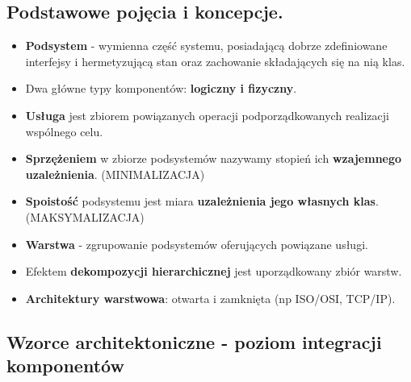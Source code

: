 \documentclass[a4paper]{article}
\begin{document}
    \subsection{Podstawowe pojęcia i koncepcje.}
    \begin{itemize}
        \item \textbf{Podsystem} - wymienna część systemu, posiadającą dobrze zdefiniowane interfejsy i
        hermetyzującą stan oraz zachowanie składających się na nią klas.
        \item Dwa główne typy komponentów: \textbf{logiczny i fizyczny}.
        \item \textbf{Usługa} jest zbiorem powiązanych operacji podporządkowanych realizacji wspólnego
        celu.
        \item \textbf{Sprzężeniem} w zbiorze podsystemów nazywamy stopień ich \textbf{wzajemnego uzależnienia}. (MINIMALIZACJA)
        \item \textbf{Spoistość} podsystemu jest miara \textbf{uzależnienia jego własnych klas}. (MAKSYMALIZACJA)
        \item \textbf{Warstwa} - zgrupowanie podsystemów oferujących powiązane usługi.
        \item Efektem \textbf{dekompozycji hierarchicznej} jest uporządkowany zbiór warstw.
        \item \textbf{Architektury warstwowa}: otwarta i zamknięta (np ISO/OSI, TCP/IP).
    \end{itemize}


    \subsection{Wzorce architektoniczne - poziom integracji komponentów}
\end{document}
